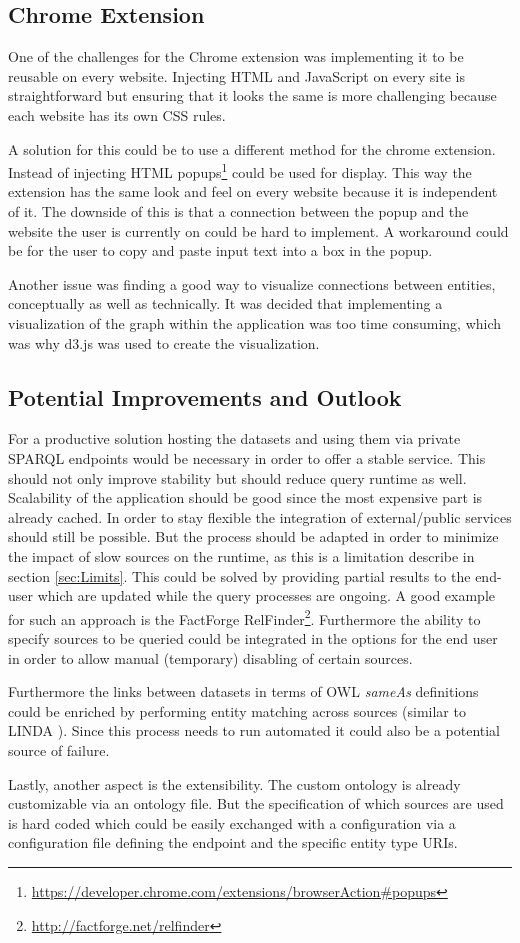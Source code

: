\subsection{Chrome Extension}
One of the challenges for the Chrome extension was implementing it to be reusable on every website. Injecting HTML and JavaScript on every site is straightforward but ensuring that it looks the same is more challenging because each website has its own CSS rules.

A solution for this could be to use a different method for the chrome extension. Instead of injecting HTML popups\footnote{\url{https://developer.chrome.com/extensions/browserAction\#popups}} could be used for display. This way the extension has the same look and feel on every website because it is independent of it. The downside of this is that a connection between the popup and the website the user is currently on could be hard to implement. A workaround could be for the user to copy and paste input text into a box in the popup. 

Another issue was finding a good way to visualize connections between entities, conceptually as well as technically. It was decided that implementing a visualization of the graph within the application was too time consuming, which was why d3.js was used to create the visualization.


\subsection{Potential Improvements and Outlook}
For a productive solution hosting the datasets and using them via private SPARQL endpoints would be necessary in order to offer a stable service. This should not only improve stability but should reduce query runtime as well. Scalability of the application should be good since the most expensive part is already cached. 
In order to stay flexible the integration of external/public services should still be possible. But the process should be adapted in order to minimize the impact of slow sources on the runtime, as this is a limitation describe in section \ref{sec:Limits}. This could be solved by providing partial results to the end-user which are updated while the query processes are ongoing. A good example for such an approach is the FactForge RelFinder\footnote{\url{http://factforge.net/relfinder}}. Furthermore the ability to specify sources to be queried could be integrated in the options for the end user in order to allow manual (temporary) disabling of certain sources. 

Furthermore the links between datasets in terms of OWL \textit{sameAs} definitions could be enriched by performing entity matching across sources (similar to LINDA \cite{boehm_linda:_2012}). Since this process needs to run automated it could also be a potential source of failure. 

Lastly, another aspect is the extensibility. The custom ontology is already customizable via an ontology file. But the specification of which sources are used is hard coded which could be easily exchanged with a configuration via a configuration file defining the endpoint and the specific entity type URIs. 



